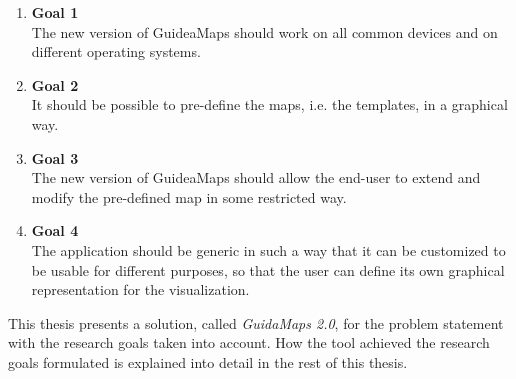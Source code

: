 \begin{enumerate}[label={\textcolor{white}{\arabic*}},ref=\arabic*]
	\item \hspace*{-2.5em}\textbf{Goal 1\label{item:goal:device-os-independent}} \hfill \\
	The new version of GuideaMaps should work on all common devices and on different operating systems.
	
	\item \hspace*{-2.5em}\textbf{Goal 2\label{item:goal:templates}} \hfill \\
	It should be possible to pre-define the maps, i.e. the templates, in a graphical way.
	
	\item \hspace*{-2.5em}\textbf{Goal 3\label{item:goal:extend-modify}} \hfill \\
	The new version of GuideaMaps should allow the end-user to extend and modify the pre-defined map in some restricted way.
	
	\item \hspace*{-2.5em}\textbf{Goal 4\label{item:goal:generic}} \hfill \\
	The application should be generic in such a way that it can be customized to be usable for different purposes, so that the user can define its own graphical representation for the visualization.
\end{enumerate}

This thesis presents a solution, called \textit{GuidaMaps 2.0}, for the problem statement with the research goals taken into account. How the tool achieved the research goals formulated is explained into detail in the rest of this thesis.